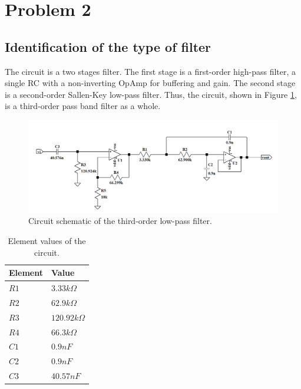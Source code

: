 \section{Problem 2}

\subsection{Identification of the type of filter}

The circuit is a two stages filter. The first stage is a first-order high-pass filter, a single RC with a non-inverting OpAmp for buffering and gain. The second stage is a second-order Sallen-Key low-pass filter. Thus, the circuit, shown in Figure \ref{fig:sch_ex2}, is a third-order pass band filter as a whole. 

\begin{figure}[H]
    \centering
    \includegraphics[width=1\linewidth]{images/sch_ex2.png}
    \caption{Circuit schematic of the third-order low-pass filter.}
    \label{fig:sch_ex2}
\end{figure}

\begin{table}[h]
    \centering
    \caption{Element values of the circuit.}
    \begin{tabularx}{\textwidth}{>{\centering\arraybackslash}X >{\centering\arraybackslash}X}
        \toprule
        \textbf{Element} & \textbf{Value}\\
        \midrule
        $R1$ & $3.33k\Omega$\\ \midrule
        $R2$ &  $62.9k\Omega$ \\ \midrule
        $R3$ & $120.92k\Omega$ \\ \midrule
        $R4$ &  $66.3k\Omega$\\ \midrule
        $C1$ & $0.9nF$ \\ \midrule
        $C2$ & $0.9nF$  \\ \midrule
        $C3$ & $40.57nF$ \\
        \bottomrule
    \end{tabularx}
    \label{tab:elements}
\end{table}

